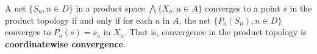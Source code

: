 A net $\{S_n, n \in D\}$ in a product space $\bigwedge \{X_a : a \in A\}$ converges to a point $s$ in the product topology if and only if for each $a$ in $A$, the net $\{P_a(S_n), n \in D\}$ converges to $P_a(s) = s_a$ in $X_a$. That is, convergence in the product topology is \textbf{coordinatewise convergence}.
